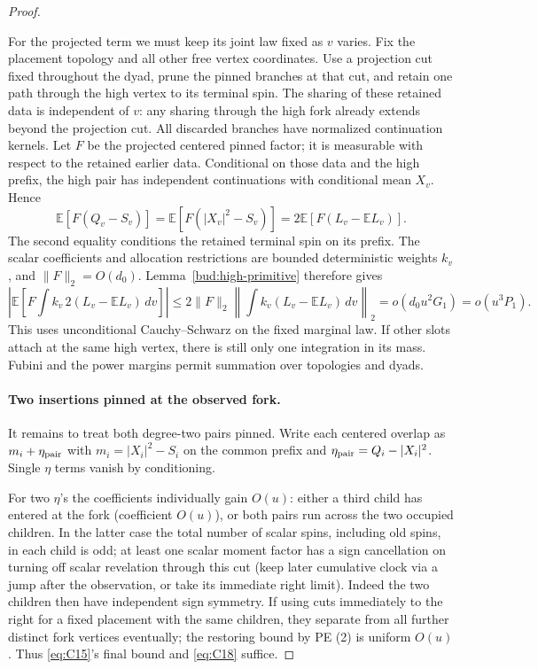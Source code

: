 \begin{proof}
\begin{enumerate}[label=(\roman*)]
For the projected term we must keep its joint law fixed as \(v\)
varies. Fix the placement topology and all other free vertex
coordinates. Use a projection cut fixed throughout the dyad, prune the
pinned branches at that cut, and retain one path through the high
vertex to its terminal spin. The sharing of these retained data is
independent of \(v\): any sharing through the high fork already
extends beyond the projection cut. All discarded branches have
normalized continuation kernels. Let \(F\) be the projected centered
pinned factor; it is measurable with respect to the retained earlier
data. Conditional on those data and the high prefix, the high pair has
independent continuations with conditional mean \(X_v\). Hence
\[
 \mathbb E[F(Q_v-S_v)]
 =\mathbb E[F(|X_v|^2-S_v)]
 =2\mathbb E[F(L_v-\mathbb EL_v)].
\]
The second equality conditions the retained terminal spin on its prefix.
The scalar coefficients and allocation restrictions are bounded
deterministic weights \(k_v\), and \(\|F\|_2=O(d_0)\).
Lemma~\ref{bud:high-primitive} therefore gives
\[
 \left|\mathbb E\left[F\int k_v\,2(L_v-\mathbb EL_v)\,dv\right]\right|
 \le2\|F\|_2
       \left\|\int k_v(L_v-\mathbb EL_v)\,dv\right\|_2
 =o(d_0u^2G_1)=o(u^3P_1).
\]
This uses unconditional Cauchy--Schwarz on the fixed marginal law.
If other slots attach at the same high vertex, there is still only one
integration in its mass. Fubini and the power margins permit summation
over topologies and dyads.

\end{enumerate}



\paragraph{Two insertions pinned at the observed fork.}

It remains to treat both degree-two pairs pinned. Write each centered overlap as \(m_i+\eta_{\rm pair}\) with \(m_i=|X_i|^2-S_i\) on the common prefix and \(\eta_{\rm pair}=Q_i-|X_i|^2\). Single \(\eta\) terms vanish by conditioning.

For two \(\eta\)'s the coefficients individually gain \(O(u)\): either a third child has entered at the fork (coefficient \(O(u)\)), or both pairs run across the two occupied children. In the latter case the total number of scalar spins, including old spins, in each child is odd; at least one scalar moment factor has a sign cancellation on turning off scalar revelation through this cut (keep later cumulative clock via a jump after the observation, or take its immediate right limit). Indeed the two children then have independent sign symmetry. If using cuts immediately to the right for a fixed placement with the same children, they separate from all further distinct fork vertices eventually; the restoring bound by PE (2) is uniform \(O(u)\). Thus \eqref{eq:C15}'s final bound and \eqref{eq:C18} suffice.


\end{proof}
